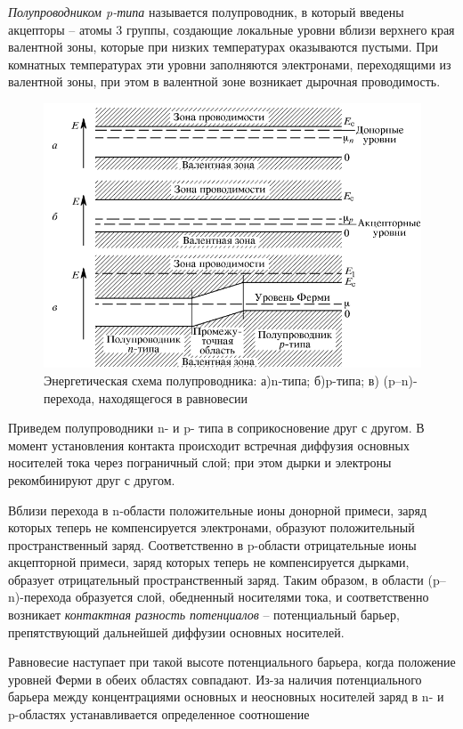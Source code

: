 \documentclass[a4paper,12pt]{article}
\begin{document}
\textit{Полупроводником p-типа} называется полупроводник, в который введены акцепторы -- атомы 3 группы, создающие локальные уровни вблизи верхнего края валентной зоны, которые при низких температурах оказываются пустыми. При комнатных температурах эти уровни заполняются электронами, переходящими из валентной зоны, при этом в валентной зоне возникает дырочная проводимость.
	
\begin{figure}[h!]
	\centering
	\includegraphics[width=0.8\linewidth]{semiconductor_energy}
	\caption{Энергетическая схема полупроводника: а)n-типа; б)p-типа; в) (p--n)-перехода, находящегося в равновесии}
\end{figure}

	
Приведем полупроводники n- и p- типа в соприкосновение друг с другом. В момент установления контакта происходит встречная диффузия основных носителей тока через пограничный слой; при этом дырки и электроны рекомбинируют друг с другом.

Вблизи перехода в n-области положительные ионы донорной примеси, заряд которых теперь не компенсируется электронами, образуют положительный пространственный заряд. Соответственно в p-области отрицательные ионы акцепторной примеси, заряд которых теперь не компенсируется дырками, образует отрицательный пространственный заряд. Таким образом, в области (p--n)-перехода образуется слой, обедненный носителями тока, и соответственно возникает \textit{контактная разность потенциалов} -- потенциальный барьер, препятствующий дальнейшей диффузии основных носителей.

\pagebreak

Равновесие наступает при такой высоте потенциального барьера, когда положение уровней Ферми в обеих областях совпадают. Из-за наличия потенциального барьера между концентрациями основных и неосновных носителей заряд в n- и p-областях устанавливается определенное соотношение
\end{document}
